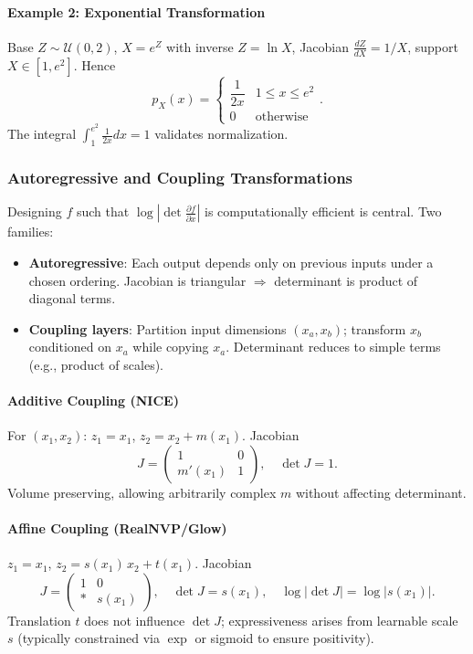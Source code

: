 \documentclass[11pt]{article}
\begin{document}
\paragraph{Example 2: Exponential Transformation}
Base $Z \sim \mathcal{U}(0,2)$, $X = e^{Z}$ with inverse $Z = \ln X$, Jacobian $\frac{dZ}{dX}=1/X$, support $X \in [1,e^{2}]$. Hence
\begin{equation}
 p_X(x) = \begin{cases}\dfrac{1}{2x} & 1 \le x \le e^{2} \\ 0 & \text{otherwise}\end{cases}.
\end{equation}
The integral $\int_{1}^{e^{2}} \frac{1}{2x} dx = 1$ validates normalization.

\subsubsection{Autoregressive and Coupling Transformations}
Designing $f$ such that $\log \left| \det \frac{\partial f}{\partial x} \right|$ is computationally efficient is central. Two families:
\begin{itemize}
 \item \textbf{Autoregressive}: Each output depends only on previous inputs under a chosen ordering. Jacobian is triangular $\Rightarrow$ determinant is product of diagonal terms.
 \item \textbf{Coupling layers}: Partition input dimensions $(x_a, x_b)$; transform $x_b$ conditioned on $x_a$ while copying $x_a$. Determinant reduces to simple terms (e.g., product of scales).
\end{itemize}

\paragraph{Additive Coupling (NICE)} For $(x_1,x_2)$: $z_1 = x_1$, $z_2 = x_2 + m(x_1)$. Jacobian
\begin{equation}
 J = \begin{pmatrix}1 & 0 \\ m'(x_1) & 1\end{pmatrix},\quad \det J = 1.
\end{equation}
Volume preserving, allowing arbitrarily complex $m$ without affecting determinant.

\paragraph{Affine Coupling (RealNVP/Glow)} $z_1 = x_1$, $z_2 = s(x_1)\, x_2 + t(x_1)$. Jacobian
\begin{equation}
 J = \begin{pmatrix}1 & 0 \\ * & s(x_1)\end{pmatrix},\quad \det J = s(x_1),\quad \log |\det J| = \log |s(x_1)|.
\end{equation}
Translation $t$ does not influence $\det J$; expressiveness arises from learnable scale $s$ (typically constrained via $\exp$ or sigmoid to ensure positivity).
\end{document}
